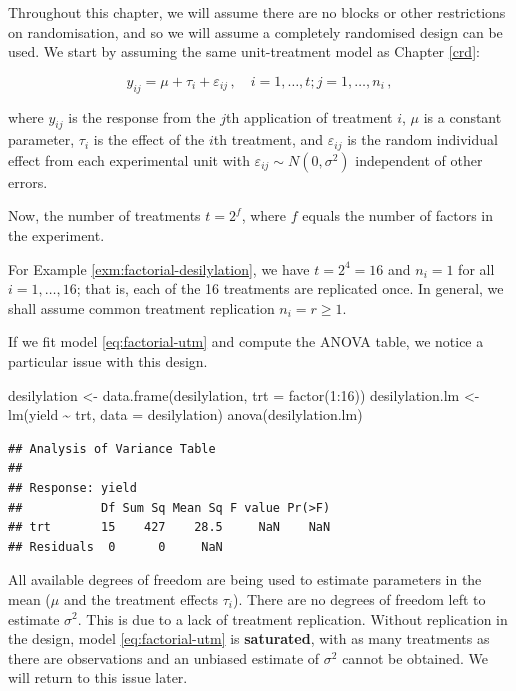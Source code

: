 \documentclass[
]{book}
\newenvironment{Shaded}{\begin{snugshade}}{\end{snugshade}}
\newcommand{\AttributeTok}[1]{\textcolor[rgb]{0.77,0.63,0.00}{#1}}
\newcommand{\DecValTok}[1]{\textcolor[rgb]{0.00,0.00,0.81}{#1}}
\newcommand{\FunctionTok}[1]{\textcolor[rgb]{0.00,0.00,0.00}{#1}}
\newcommand{\NormalTok}[1]{#1}
\newcommand{\OtherTok}[1]{\textcolor[rgb]{0.56,0.35,0.01}{#1}}
\newcommand{\SpecialCharTok}[1]{\textcolor[rgb]{0.00,0.00,0.00}{#1}}
\theoremstyle{definition}
\theoremstyle{definition}
\theoremstyle{definition}
\theoremstyle{definition}
\theoremstyle{remark}
\begin{document}
Throughout this chapter, we will assume there are no blocks or other restrictions on randomisation, and so we will assume a completely randomised design can be used. We start by assuming the same unit-treatment model as Chapter \ref{crd}:

\begin{equation}
y_{ij} = \mu + \tau_i + \varepsilon_{ij}\,, \quad i = 1, \ldots, t; j = 1, \ldots, n_i\,, \label{eq:factorial-utm}
\end{equation}

where \(y_{ij}\) is the response from the \(j\)th application of treatment \(i\), \(\mu\) is a constant parameter, \(\tau_i\) is the effect of the \(i\)th treatment, and \(\varepsilon_{ij}\) is the random individual effect from each experimental unit with \(\varepsilon_{ij} \sim N(0, \sigma^2)\) independent of other errors.

Now, the number of treatments \(t = 2^f\), where \(f\) equals the number of factors in the experiment.

For Example \ref{exm:factorial-desilylation}, we have \(t = 2^4 = 16\) and \(n_i = 1\) for all \(i=1,\ldots, 16\); that is, each of the 16 treatments are replicated once. In general, we shall assume common treatment replication \(n_i = r \ge 1\).

If we fit model \eqref{eq:factorial-utm} and compute the ANOVA table, we notice a particular issue with this design.

\begin{Shaded}
\begin{Highlighting}[]
\NormalTok{desilylation }\OtherTok{\textless{}{-}} \FunctionTok{data.frame}\NormalTok{(desilylation, }\AttributeTok{trt =} \FunctionTok{factor}\NormalTok{(}\DecValTok{1}\SpecialCharTok{:}\DecValTok{16}\NormalTok{))}
\NormalTok{desilylation.lm }\OtherTok{\textless{}{-}} \FunctionTok{lm}\NormalTok{(yield }\SpecialCharTok{\textasciitilde{}}\NormalTok{ trt, }\AttributeTok{data =}\NormalTok{ desilylation)}
\FunctionTok{anova}\NormalTok{(desilylation.lm)}
\end{Highlighting}
\end{Shaded}

\begin{verbatim}
## Analysis of Variance Table
## 
## Response: yield
##           Df Sum Sq Mean Sq F value Pr(>F)
## trt       15    427    28.5     NaN    NaN
## Residuals  0      0     NaN
\end{verbatim}

All available degrees of freedom are being used to estimate parameters in the mean (\(\mu\) and the treatment effects \(\tau_i\)). There are no degrees of freedom left to estimate \(\sigma^2\). This is due to a lack of treatment replication. Without replication in the design, model \eqref{eq:factorial-utm} is \textbf{saturated}, with as many treatments as there are observations and an unbiased estimate of \(\sigma^2\) cannot be obtained. We will return to this issue later.
\end{document}
